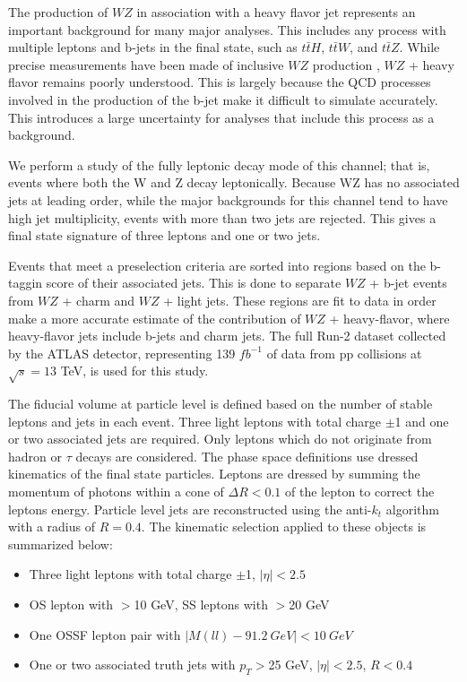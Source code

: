 
The production of $WZ$ in association with a heavy flavor jet represents an important background for many major analyses. This includes any process with multiple leptons and b-jets in the final state, such as $t\bar{t}H$, $t\bar{t}W$, and $t\bar{t}Z$. While precise measurements have been made of inclusive $WZ$ production \cite{WZ_36}, $WZ$ + heavy flavor remains poorly understood. This is largely because the QCD processes involved in the production of the b-jet make it difficult to simulate accurately. This introduces a large uncertainty for analyses that include this process as a background.  

We perform a study of the fully leptonic decay mode of this channel; that is, events where both the W and Z decay leptonically. Because WZ has no associated jets at leading order, while the major backgrounds for this channel tend to have high jet multiplicity, events with more than two jets are rejected. This gives a final state signature of three leptons and one or two jets.

Events that meet a preselection criteria are sorted into regions based on the b-taggin score of their associated jets. This is done to separate $WZ$ + b-jet events from $WZ$ + charm and $WZ$ + light jets. These regions are fit to data in order make a more accurate estimate of the contribution of $WZ$ + heavy-flavor, where heavy-flavor jets include b-jets and charm jets. The full Run-2 dataset collected by the ATLAS detector, representing 139 $fb^{-1}$ of data from pp collisions at $\sqrt{s} = 13$ TeV, is used for this study.

The fiducial volume at particle level is defined based on the number of stable leptons and jets in each event. Three light leptons with total charge $\pm$1 and one or two associated jets are required. Only leptons which do not originate from hadron or $\tau$ decays are considered. The phase space definitions use dressed kinematics of the final state particles. Leptons are dressed by summing the momentum of photons within a cone of $\Delta R < 0.1$ of the lepton to correct the leptons energy. Particle level jets are reconstructed using the anti-$k_t$ algorithm with a radius of $R=0.4$. The kinematic selection applied to these objects is summarized below:

\begin{itemize}
\item Three light leptons with total charge $\pm$1, $|\eta| < 2.5$
\item OS lepton with \pt$>$10 GeV, SS leptons with \pt$>$20 GeV
\item One OSSF lepton pair with $|M(ll)-91.2\ GeV| < 10\ GeV$
\item One or two associated truth jets with $p_T >$25 GeV, $|\eta| < 2.5$, $R<0.4$
\end{itemize}


